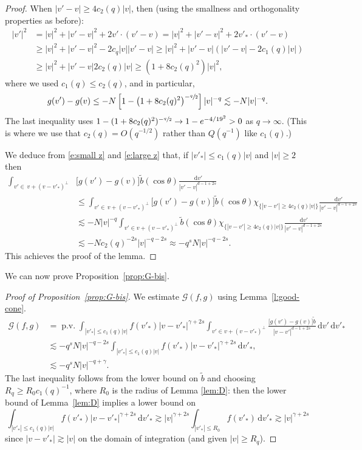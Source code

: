 \documentclass[11pt]{article}
\theoremstyle{plain}
\theoremstyle{definition}
\numberwithin{equation}{section}
\newcommand{\dd} {\, \mathrm{d}}
\DeclareMathOperator{\PV}{p.v.}
\let\A N
\begin{document}
\begin{proof}
When $|v'-v| \ge 4 c_2(q)|v|$, then (using the smallness and orthogonality
properties as before):
\begin{align*}
|v'|^2 & = |v|^2 + |v'-v|^2 + 2 v'\cdot (v'-v) = |v|^2 + |v'-v|^2 + 2
v'_* \cdot (v'-v)\\
& \ge |v|^2 + |v'-v|^2 -2c_q |v||v'-v| \ge |v|^2 + |v'-v|
\left( |v'-v| -2c_1(q) |v| \right) \\
& \ge |v|^2 + |v'-v| 2c_2(q) |v| \ge (1 + 8 c_2(q)^2) |v|^2,
\end{align*}
where we used $c_1(q) \le c_2(q)$, and in particular,
\begin{equation}\label{e:large z}
g(v') - g(v) \le - \A \left[1-\left(1+8c_2(q)^2\right)^{-\sfrac{q}2}
\right]|v|^{-q} \lesssim -\A |v|^{-q}.
\end{equation}
The last inequality uses $1 - (1+8 c_2(q)^2)^{-\sfrac{q}2} \to 1 - e^{-4/19^2} >0$
as $q \to \infty$. (This is where we use that $c_2(q) = O(q^{-1/2})$
rather than $Q(q^{-1})$ like $c_1(q)$.)

We deduce from \eqref{e:small z} and \eqref{e:large z} that, if
$|v'_*| \le c_1(q) |v|$ and $|v| \ge 2$ then
\begin{align*}
\int_{v' \in \, v + (v-v'_*)^\bot}& \big[ g(v') - g(v) \big] \tilde
b(\cos \theta) \frac{\dd v'}{|v'-v|^{d-1+2s}} \\
& \le \int_{v' \in \, v + (v-v'_*)^\bot} \big[ g(v') - g(v) \big] \tilde
b(\cos \theta) \chi_{\{|v-v'| \ge 4c_2(q) |v|\}} \frac{\dd v'}{|v'-v|^{d-1+2s}} \\
& \lesssim - \A |v|^{-q} \int_{v' \in v + (v-v'_*)^\bot} \tilde
b(\cos \theta) \chi_{\{|v-v'| \ge 4c_2(q) |v|\}} \frac{\dd v'}{|v'-v|^{d-1+2s}} \\
& \lesssim - \A c_2(q)^{-2s}|v|^{-q-2s} \approx -q^s \A |v|^{-q-2s}.
\end{align*}
This achieves the proof of the lemma.
\end{proof}
We can now prove Proposition~\ref{prop:G-bis}.

\begin{proof}[Proof of Proposition~\ref{prop:G-bis}]
We estimate $\mathcal G(f,g)$ using Lemma~\ref{l:good-cone}.
\begin{align*}
\mathcal{G} (f,g) & = \PV \int_{|v'_*| \le c_1(q) |v|} f(v'_*)
|v-v'_*|^{\gamma+2s} \int_{v' \in v +
(v-v'_*)^\bot}
\frac{\big[ g(v')-g(v) \big] \tilde b}{|v-v'|^{d-1+2s}}
\dd v' \dd v'_* \\
&\lesssim - q^{s} \A |v|^{-q-2s} \int_{|v'_*| \le c_1(q) |v|} f(v'_*) |v-v'_*|^{\gamma+2s} \dd v'_*, \\
&\lesssim - q^{s} \A |v|^{-q+\gamma}.
\end{align*}
The last inequality follows from the lower bound on $\tilde b$ and
choosing $R_q \ge R_0 c_1(q)^{-1}$, where $R_0$ is the radius of Lemma
\ref{lem:D}: then the lower bound of Lemma~\ref{lem:D} implies a lower
bound on
\[
\int_{|v'_*| \le c_1(q) |v|} f(v'_*) |v-v'_*|^{\gamma+2s} \dd v'_* \gtrsim
|v|^{\gamma+2s} \int_{|v'_*| \le R_0} f(v'_*) \dd v'_* \gtrsim |v|^{\gamma+2s}
\]
since $|v-v'_*| \gtrsim |v|$ on the domain of integration (and given
$|v| \ge R_q$).
\end{proof}
\end{document}
